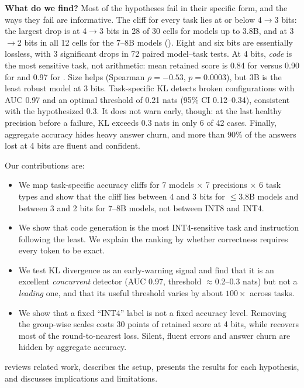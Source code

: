 {\bf What do we find?} Most of the hypotheses fail in their specific form, and the ways they fail are informative. The cliff for every task lies at or below 4$\to$3 bits: the largest drop is at 4$\to$3 bits in 28 of 30 cells for models up to 3.8B, and at 3$\to$2 bits in all 12 cells for the 7--8B models (). Eight and six bits are essentially lossless, with 3 significant drops in 72 paired model--task tests. At 4 bits, \emph{code} is the most sensitive task, not arithmetic: mean retained score is 0.84 for \humaneval versus 0.90 for \gsm and 0.97 for \ifeval. Size helps (Spearman $\rho=-0.53$, $p=0.0003$), but \qwen 3B is the least robust \qwen model at 3 bits. Task-specific KL detects broken configurations with AUC 0.97 and an optimal threshold of 0.21 nats (95\% CI 0.12--0.34), consistent with the hypothesized 0.3. It does not warn early, though: at the last healthy precision before a failure, KL exceeds 0.3 nats in only 6 of 42 cases. Finally, aggregate accuracy hides heavy answer churn, and more than 90\% of the answers lost at 4 bits are fluent and confident.

Our contributions are:
\begin{itemize}[leftmargin=*,itemsep=0pt,topsep=0pt]
    \item We map task-specific accuracy cliffs for 7 models $\times$ 7 precisions $\times$ 6 task types and show that the cliff lies between 4 and 3 bits for $\le$3.8B models and between 3 and 2 bits for 7--8B models, not between INT8 and INT4.
    \item We show that code generation is the most INT4-sensitive task and instruction following the least. We explain the ranking by whether correctness requires every token to be exact.
    \item We test KL divergence as an early-warning signal and find that it is an excellent \emph{concurrent} detector (AUC 0.97, threshold $\approx$0.2--0.3 nats) but not a \emph{leading} one, and that its useful threshold varies by about $100\times$ across tasks.
    \item We show that a fixed ``INT4'' label is not a fixed accuracy level. Removing the group-wise scales costs 30 points of retained score at 4 bits, while \awq recovers most of the round-to-nearest loss. Silent, fluent errors and answer churn are hidden by aggregate accuracy.
\end{itemize}

 reviews related work,  describes the setup,  presents the results for each hypothesis, and  discusses implications and limitations.
